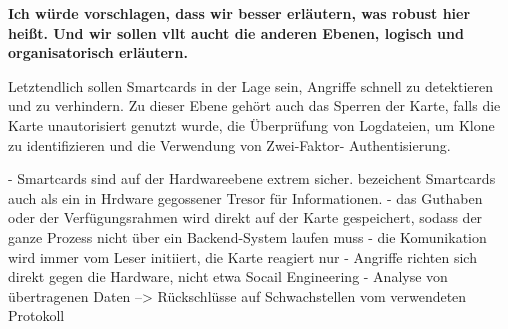 \textbf{Ich würde vorschlagen, dass wir besser erläutern, was robust hier heißt. Und wir sollen vllt
aucht die anderen Ebenen, logisch und organisatorisch erläutern.}


Letztendlich sollen Smartcards in der Lage sein, Angriffe schnell zu detektieren und zu verhindern.
Zu dieser Ebene gehört auch das Sperren der Karte, falls die Karte unautorisiert genutzt wurde, 
die Überprüfung von Logdateien, um Klone zu identifizieren und die Verwendung von Zwei-Faktor-
Authentisierung.


- Smartcards sind auf der Hardwareebene extrem sicher. \cite{refmas:ASSS} bezeichent Smartcards auch als 
  ein in Hrdware gegossener Tresor für Informationen. 
- das Guthaben oder der Verfügungsrahmen wird direkt auf der Karte gespeichert, sodass der ganze Prozess nicht über ein Backend-System laufen muss
- die Komunikation wird immer vom Leser initiiert, die Karte reagiert nur
- Angriffe richten sich direkt gegen die Hardware, nicht etwa Socail Engineering 
- Analyse von übertragenen Daten --> Rückschlüsse auf Schwachstellen vom verwendeten Protokoll

